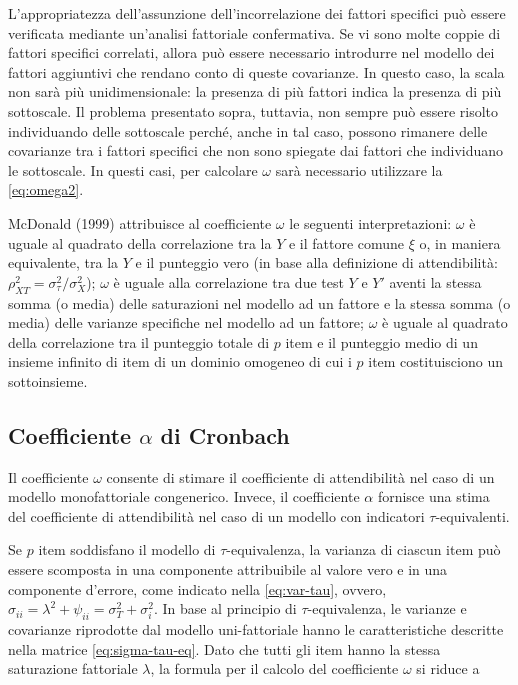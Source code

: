 \documentclass[
  11pt,
]{krantz}
\theoremstyle{definition}
\theoremstyle{definition}
\theoremstyle{definition}
\theoremstyle{definition}
\theoremstyle{remark}
\begin{document}
L'appropriatezza dell'assunzione dell'incorrelazione dei fattori specifici può essere verificata mediante un'analisi fattoriale confermativa. Se vi sono molte coppie di fattori specifici correlati, allora può essere necessario introdurre nel modello dei fattori aggiuntivi che rendano conto di queste covarianze. In questo caso, la scala non sarà più unidimensionale: la presenza di più fattori indica la presenza di più sottoscale. Il problema presentato sopra, tuttavia, non sempre può essere risolto individuando delle sottoscale perché, anche in tal caso, possono rimanere delle covarianze tra i fattori specifici che non sono spiegate dai fattori che individuano le sottoscale. In questi casi, per calcolare \(\omega\) sarà necessario utilizzare la \eqref{eq:omega2}.

McDonald (1999) attribuisce al coefficiente \(\omega\) le seguenti interpretazioni: \(\omega\) è uguale al quadrato della correlazione tra la \(Y\) e il fattore comune \(\xi\) o, in maniera equivalente, tra la \(Y\) e il punteggio vero (in base alla definizione di attendibilità: \(\rho_{XT}^2=\sigma^2_{\tau}/\sigma^2_X\)); \(\omega\) è uguale alla correlazione tra due test \(Y\) e \(Y'\) aventi la stessa somma (o media) delle saturazioni nel modello ad un fattore e la stessa somma (o media) delle varianze specifiche nel modello ad un fattore; \(\omega\) è uguale al quadrato della correlazione tra il punteggio totale di \(p\) item e il punteggio medio di un insieme infinito di item di un dominio omogeneo di cui i \(p\) item costituisciono un sottoinsieme.

\hypertarget{coefficiente-alpha-di-cronbach}{%
\subsection{\texorpdfstring{Coefficiente \(\alpha\) di Cronbach}{Coefficiente \textbackslash alpha di Cronbach}}\label{coefficiente-alpha-di-cronbach}}

Il coefficiente \(\omega\) consente di stimare il coefficiente di attendibilità nel caso di un modello monofattoriale congenerico. Invece, il coefficiente \(\alpha\) fornisce una stima del coefficiente di attendibilità nel caso di un modello con indicatori \(\tau\)-equivalenti.

Se \(p\) item soddisfano il modello di \(\tau\)-equivalenza, la varianza di ciascun item può essere scomposta in una componente attribuibile al valore vero e in una componente d'errore, come indicato nella \eqref{eq:var-tau}, ovvero, \(\sigma_{ii} = \lambda^2 + \psi_{ii} =\sigma^2_T + \sigma^2_i\). In base al principio di \(\tau\)-equivalenza, le varianze e covarianze riprodotte dal modello uni-fattoriale hanno le caratteristiche descritte nella matrice \eqref{eq:sigma-tau-eq}. Dato che tutti gli item hanno la stessa saturazione fattoriale \(\lambda\), la formula per il calcolo del coefficiente \(\omega\) si riduce a
\end{document}
